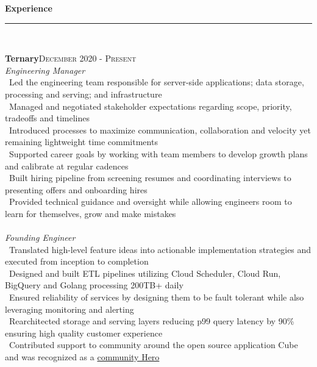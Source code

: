 \documentclass[a4paper,10pt]{article}
\newcommand{\horizontalline}{{\rule{533pt}{0.625pt}\\}}
\renewcommand{\section}[1]{{\noindent\textbf{\large #1}\\\horizontalline}}
\renewcommand{\subsection}[2]{{\noindent \textbf{#1}\hfill \textsc{#2}\\}}
\begin{document}
\par{ \par}
\par{ \par}
\bigskip
\bigskip

\section{Experience}
\subsection{Ternary}{December 2020 - Present}
\textit{Engineering Manager}\\
\textbullet\ Led the engineering team responsible for server-side applications; data storage, processing and serving; and infrastructure\\
\textbullet\ Managed and negotiated stakeholder expectations regarding scope, priority, tradeoffs and timelines\\
\textbullet\ Introduced processes to maximize communication, collaboration and velocity yet remaining lightweight time commitments\\
\textbullet\ Supported career goals by working with team members to develop growth plans and calibrate at regular cadences\\
\textbullet\ Built hiring pipeline from screening resumes and coordinating interviews to presenting offers and onboarding hires\\
\textbullet\ Provided technical guidance and oversight while allowing engineers room to learn for themselves, grow and make mistakes\\ \\
\textit{Founding Engineer}\\
\textbullet\ Translated high-level feature ideas into actionable implementation strategies and executed from inception to completion\\
\textbullet\ Designed and built ETL pipelines utilizing Cloud Scheduler, Cloud Run, BigQuery and Golang processing 200TB+ daily\\
\textbullet\ Ensured reliability of services by designing them to be fault tolerant while also leveraging monitoring and alerting\\
\textbullet\ Rearchitected storage and serving layers reducing p99 query latency by 90\% ensuring high quality customer experience\\
\textbullet\ Contributed support to community around the open source application Cube and was recognized as a \href{https://cube.dev/community}{community Hero}\\
\end{document}

